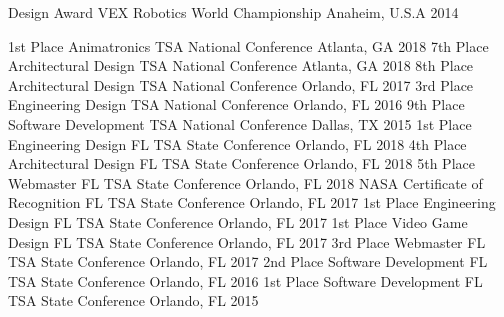 \begin{cvhonors}
  \cvhonor
    {Design Award}
    {VEX Robotics World Championship}
    {Anaheim, U.S.A}
    {2014}
\end{cvhonors}

\begin{cvhonors}
  \cvhonor
    {1st Place Animatronics}
    {TSA National Conference}
    {Atlanta, GA}
    {2018}
  \cvhonor
    {7th Place Architectural Design}
    {TSA National Conference}
    {Atlanta, GA}
    {2018}
  \cvhonor
    {8th Place Architectural Design}
    {TSA National Conference}
    {Orlando, FL}
    {2017}
  \cvhonor
    {3rd Place Engineering Design}
    {TSA National Conference}
    {Orlando, FL}
    {2016}
  \cvhonor
    {9th Place Software Development}
    {TSA National Conference}
    {Dallas, TX}
    {2015}
  \cvhonor
    {1st Place Engineering Design}
    {FL TSA State Conference}
    {Orlando, FL}
    {2018}
  \cvhonor
    {4th Place Architectural Design}
    {FL TSA State Conference}
    {Orlando, FL}
    {2018}
  \cvhonor
    {5th Place Webmaster}
    {FL TSA State Conference}
    {Orlando, FL}
    {2018}
  \cvhonor
    {NASA Certificate of Recognition}
    {FL TSA State Conference}
    {Orlando, FL}
    {2017}
  \cvhonor
    {1st Place Engineering Design}
    {FL TSA State Conference}
    {Orlando, FL}
    {2017}
  \cvhonor
    {1st Place Video Game Design}
    {FL TSA State Conference}
    {Orlando, FL}
    {2017}
  \cvhonor
    {3rd Place Webmaster}
    {FL TSA State Conference}
    {Orlando, FL}
    {2017}
  \cvhonor
    {2nd Place Software Development}
    {FL TSA State Conference}
    {Orlando, FL}
    {2016}
  \cvhonor
    {1st Place Software Development}
    {FL TSA State Conference}
    {Orlando, FL}
    {2015}
\end{cvhonors}
